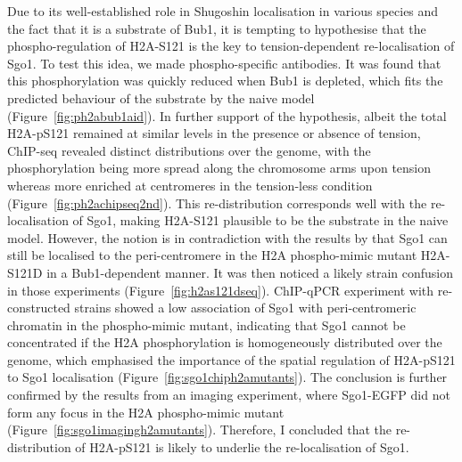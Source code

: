 Due to its well-established role in Shugoshin localisation in various species and the fact that it is a substrate of Bub1, it is tempting to hypothesise that the phospho-regulation of H2A-S121 is the key to tension-dependent re-localisation of Sgo1. To test this idea, we made phospho-specific antibodies. It was found that this phosphorylation was quickly reduced when Bub1 is depleted, which fits the predicted behaviour of the substrate by the naive model (Figure~\ref{fig:ph2abub1aid}). In further support of the hypothesis, albeit the total H2A-pS121 remained at similar levels in the presence or absence of tension, ChIP-seq revealed distinct distributions over the genome, with the phosphorylation being more spread along the chromosome arms upon tension whereas more enriched at centromeres in the tension-less condition (Figure~\ref{fig:ph2achipseq2nd}). This re-distribution corresponds well with the re-localisation of Sgo1, making H2A-S121 plausible to be the substrate in the naive model. However, the notion is in contradiction with the results by \cite{Nerusheva2014} that Sgo1 can still be localised to the peri-centromere in the H2A phospho-mimic mutant H2A-S121D in a Bub1-dependent manner. It was then noticed a likely strain confusion in those experiments (Figure~\ref{fig:h2as121dseq}). ChIP-qPCR experiment with re-constructed strains showed a low association of Sgo1 with peri-centromeric chromatin in the phospho-mimic mutant, indicating that Sgo1 cannot be concentrated if the H2A phosphorylation is homogeneously distributed over the genome, which emphasised the importance of the spatial regulation of H2A-pS121 to Sgo1 localisation (Figure~\ref{fig:sgo1chiph2amutants}). The conclusion is further confirmed by the results from an imaging experiment, where Sgo1-EGFP did not form any focus in the H2A phospho-mimic mutant (Figure~\ref{fig:sgo1imagingh2amutants}). Therefore, I concluded that the re-distribution of H2A-pS121 is likely to underlie the re-localisation of Sgo1. 

